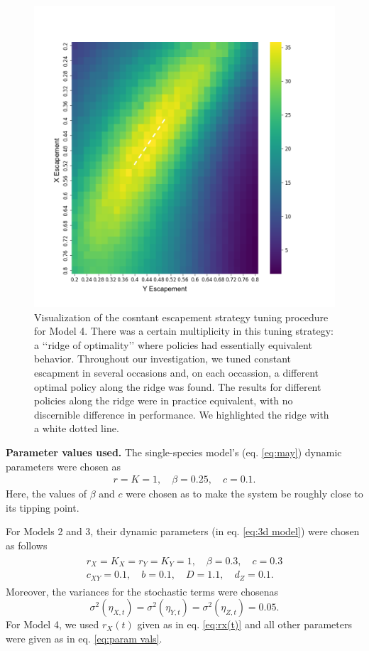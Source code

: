 \documentclass{article}
\begin{document}
\begin{figure}
  \centering
  \includegraphics[scale=0.5]{figures/esc_heatmap.png}
  \caption{Visualization of the cosntant escapement strategy tuning procedure for Model 4. There was a certain multiplicity in this tuning strategy: a ‘‘ridge of optimality’’ where policies had essentially equivalent behavior. Throughout our investigation, we tuned constant escapment in several occasions and, on each occassion, a different optimal policy along the ridge was found. The results for different policies along the ridge were in practice equivalent, with no discernible difference in performance. We highlighted the ridge with a white dotted line.}
  \label{fig:tuning}
\end{figure}

\textbf{Parameter values used.} The single-species model's (eq.
\eqref{eq:may}) dynamic parameters were chosen as \begin{align}
\label{eq:1d param vals}
r = K = 1,\quad \beta = 0.25,\quad c = 0.1.
\end{align} Here, the values of \(\beta\) and \(c\) were chosen as to
make the system be roughly close to its tipping point.

For Models 2 and 3, their dynamic parameters (in eq.
\eqref{eq:3d model}) were chosen as follows \begin{align}
\label{eq:param vals}
\begin{split}
  r_X = K_X = r_Y = K_Y = 1, \quad \beta = 0.3, \quad c = 0.3\\
  c_{XY} = 0.1,\quad b = 0.1,\quad D = 1.1, \quad d_Z = 0.1.
\end{split}
\end{align} Moreover, the variances for the stochastic terms were
chosenas \[
  \sigma^2(\eta_{X,t}) = \sigma^2(\eta_{Y,t}) = \sigma^2(\eta_{Z,t}) = 0.05.
\] For Model 4, we used \(r_X(t)\) given as in eq. \eqref{eq:rx(t)} and
all other parameters were given as in eq. \eqref{eq:param vals}.
\end{document}
